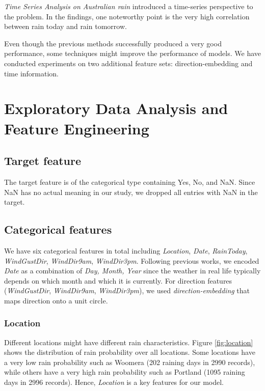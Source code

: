 \documentclass{article}
\begin{document}
\textit{Time Series Analysis on Australian rain} \cite{sudhakordassubeen} introduced a time-series perspective to the problem. In the findings, one noteworthy point is the very high correlation between rain today and rain tomorrow.

Even though the previous methods successfully produced a very good performance, some techniques might improve the performance of models. We have conducted experiments on two additional feature sets: direction-embedding and time information.

\section{Exploratory Data Analysis and Feature Engineering}

\subsection{Target feature}
The target feature is of the categorical type containing Yes, No, and NaN. Since NaN has no actual meaning in our study, we dropped all entries with NaN in the target.
 
\subsection{Categorical features}
We have six categorical features in total including \textit{Location}, \textit{Date}, \textit{RainToday}, \textit{WindGustDir}, \textit{WindDir9am}, \textit{WindDir3pm}. Following previous works, we encoded \textit{Date} as a combination of \textit{Day, Month, Year} since the weather in real life typically depends on which month and which it is currently. For direction features (\textit{WindGustDir}, \textit{WindDir9am}, \textit{WindDir3pm}), we used \textit{direction-embedding} that maps direction onto a unit circle.

\subsubsection{Location}
Different locations might have different rain characteristics. Figure \ref{fig:location} shows the distribution of rain probability over all locations. Some locations have a very low rain probability such as Woomera (202 raining days in 2990 records), while others have a very high rain probability such as Portland (1095 raining days in 2996 records). Hence, \textit{Location} is a key features for our model.
\end{document}
